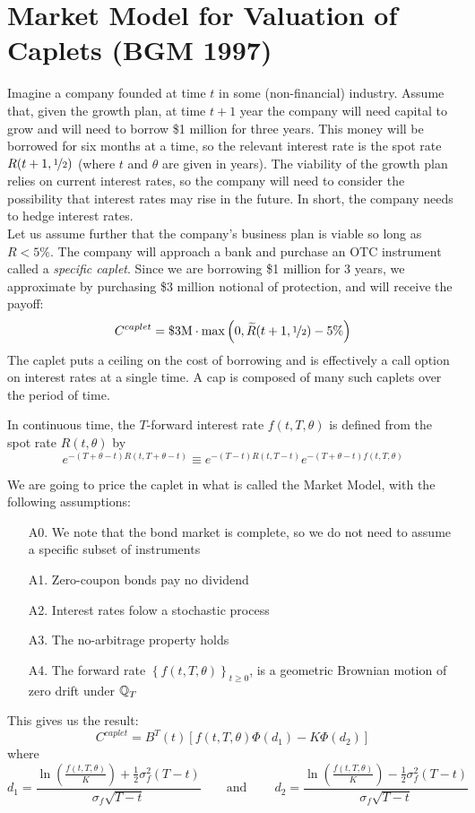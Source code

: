 \documentclass[11pt]{article}
\begin{document}
\section{Market Model for Valuation of Caplets (BGM 1997)}

Imagine a company founded at time $t$ in some (non-financial) industry. Assume that, given the growth plan, at time $t + 1$ year the company will need capital to grow and will need to borrow \$1 million for three years. This money will be borrowed for six months at a time, so the relevant interest rate is the spot rate $R(t+1, \nicefrac{1}{2})$ (where $t$ and $\theta$ are given in years).  The viability of the growth plan relies on current interest rates, so the company will need to consider the possibility that interest rates may rise in the future. In short, the company needs to hedge interest rates. \\

Let us assume further that the company's business plan is viable so long as $R < 5\%$. The company will approach a bank and purchase an OTC instrument called a {\em specific caplet}. Since we are borrowing \$1 million for 3 years, we approximate by purchasing \$3 million notional of protection, and will receive the payoff:
$$ C^{caplet} = \text{\$3M} \cdot \max\left(0, \widetilde{R}(t+1, \nicefrac{1}{2}) - 5\% \right)$$
The caplet puts a ceiling on the cost of borrowing and is effectively a call option on interest rates at a single time. A cap is composed of many such caplets over the period of time.\\

\begin{definition} In continuous time, the $T$-forward interest rate $f(t, T, \theta)$ is defined from the spot rate $R(t, \theta)$ by
$$ e^{-(T+\theta-t)R(t, T+\theta-t)}\equiv e^{-(T-t)R(t, T-t)}e^{-(T+\theta-t)f(t, T, \theta)}$$
\end{definition}

We are going to price the caplet in what is called the Market Model, with the following assumptions:
\begin{enumerate}
\item[A0.] We note that the bond market is complete, so we do not need to assume a specific subset of instruments
\item[A1.] Zero-coupon bonds pay no dividend
\item[A2.] Interest rates folow a stochastic process
\item[A3.] The no-arbitrage property holds
\item[A4.] The forward rate $\left\{f(t, T, \theta)\right\}_{t \geq 0}$, is a geometric Brownian motion of zero drift under $\operatorname{\mathbb Q}_T$
\end{enumerate}
This gives us the result:
$$ C^{caplet} = B^T(t)\left[ f(t, T, \theta) \Phi(d_1) - K \Phi(d_2)\right] $$
where
$$d_1 = \frac{\ln \left( \frac{f(t, T, \theta)}{K}\right) + \frac{1}{2}\sigma_f^2(T-t)}{\sigma_f \sqrt{T-t}} \qquad \text{and} \qquad \ d_2 = \frac{\ln \left( \frac{f(t, T, \theta)}{K}\right) - \frac{1}{2}\sigma_f^2(T-t)}{\sigma_f \sqrt{T-t}}$$
\end{document}
